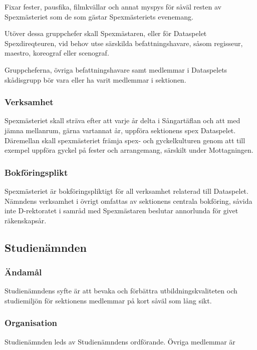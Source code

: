 \documentclass[a4paper,12pt]{article}
\begin{document}
Fixar fester, pausfika, filmkvällar och annat myspys för såväl resten av Spexmästeriet som de som gästar Spexmästeriets evenemang.

Utöver dessa gruppchefer skall Spexmästaren, eller för Dataspelet Spexdireqteuren, vid behov utse särskilda befattningshavare, såsom regisseur, maestro, koreograf eller scenograf.

Gruppcheferna, övriga befattningshavare samt medlemmar i Dataspelets skådisgrupp bör vara eller ha varit medlemmar i sektionen.

\subsubsection{Verksamhet}

Spexmästeriet skall sträva efter att varje år delta i Sångartäflan och att med jämna mellanrum, gärna vartannat år, uppföra sektionens spex Dataspelet. Däremellan skall spexmästeriet främja spex- och gyckelkulturen genom att till exempel uppföra gyckel på fester och arrangemang, särskilt under Mottagningen.

\subsubsection{Bokföringsplikt}

Spexmästeriet är bokföringspliktigt för all verksamhet relaterad till Dataspelet. Nämndens verksamhet i övrigt omfattas av sektionens centrala bokföring, såvida inte D-rektoratet i samråd med Spexmästaren beslutar annorlunda för givet räkenskapsår.

\subsection{Studienämnden}

\subsubsection{Ändamål}

Studienämndens syfte är att bevaka och förbättra utbildningskvaliteten och studiemiljön för sektionens medlemmar på kort såväl som lång sikt.

\subsubsection{Organisation}

Studienämnden leds av Studienämndens ordförande. Övriga medlemmar är
\end{document}
